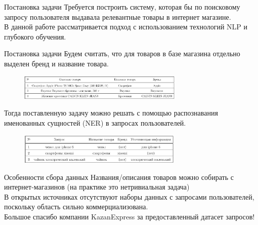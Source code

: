 \begin{frame}
	\titlepage
\end{frame}

\begin{frame}{Постановка задачи}
	Требуется построить систему, которая бы по поисковому запросу пользователя выдавала релевантные товары в интернет магазине.\\
	
	В данной работе рассматривается подход с использованием технологий NLP и глубокого обучения.
\end{frame}

\begin{frame}{Постановка задачи}
    Будем считать, что для товаров в базе магазина отдельно выделен бренд и название товара.\\
	\begin{figure}[H]
		\includegraphics[width=0.7\textwidth]{p1.jpg}
		\label{fig:sample}
	\end{figure}
    
    Тогда поставленную задачу можно решать с помощью распознавания именованных сущностей (NER) в запросах пользователей.
	\begin{figure}[H]
		\includegraphics[width=0.7\textwidth]{p2.jpg}
		\label{fig:sample}
	\end{figure}
\end{frame}

\begin{frame}{Особенности сбора данных}
    Названия/описания товаров можно собирать с интернет-магазинов (на практике это нетривиальная задача)\\

	В открытых источниках отсутствуют наборы данных с запросами пользователей, поскольку область сильно коммерциализована.\\
	
	Большое спасибо компании KazanExpress за предоставленный датасет запросов!   
\end{frame}

